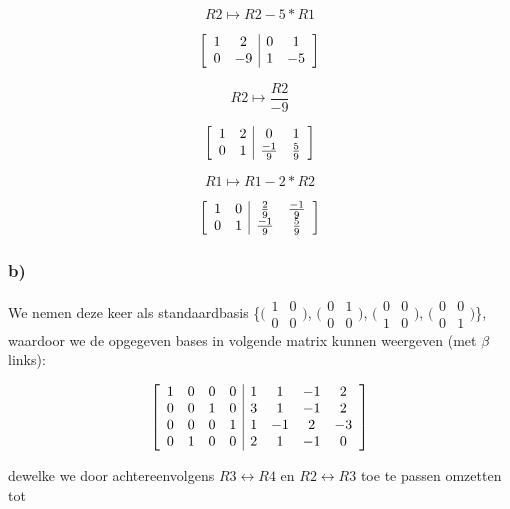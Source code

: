 \documentclass[lineaire_algebra_oplossingen.tex]{subfiles}
\begin{document}
\[R2 \mapsto R2 - 5*R1 \]

\[
\left[
\begin{array}{ c c | c c }
1 & 2 & 0 & 1\\
0 & -9 & 1 & -5
\end{array}
\right]
\]

\[R2 \mapsto \frac{R2}{-9} \]

\[
\left[
\begin{array}{ c c | c c }
1 & 2 & 0 & 1\\
0 & 1 & \frac{-1}{9} & \frac{5}{9}
\end{array}
\right]
\]

\[R1 \mapsto R1 - 2*R2 \]

\[
\left[
\begin{array}{ c c | c c }
1 & 0 & \frac{2}{9} & \frac{-1}{9}\\
0 & 1 & \frac{-1}{9} & \frac{5}{9}
\end{array}
\right]
\]

\subsubsection*{b)}

We nemen deze keer als standaardbasis \{$\bigl(
\begin{smallmatrix}
1&0\\ 0&0
\end{smallmatrix}
\bigr)$,
$\bigl(
\begin{smallmatrix}
0&1\\ 0&0
\end{smallmatrix}
\bigr)$,
$\bigl(
\begin{smallmatrix}
0&0\\ 1&0
\end{smallmatrix}
\bigr)$,
$\bigl(
\begin{smallmatrix}
0&0\\ 0&1
\end{smallmatrix}
\bigr)$\}, waardoor we de opgegeven bases in volgende matrix kunnen weergeven (met $\beta$ links):

\[
\left[
\begin{array}{ c c c c | c c c c }
1 & 0 & 0 & 0 & 1 & 1 & -1 & 2\\
0 & 0 & 1 & 0 & 3 & 1 & -1 & 2\\
0 & 0 & 0 & 1 & 1 & -1 & 2 & -3\\
0 & 1 & 0 & 0 & 2 & 1 & -1 & 0
\end{array}
\right]
\]

dewelke we door achtereenvolgens $R3 \leftrightarrow R4$ en $R2 \leftrightarrow R3$ toe te passen omzetten tot
\end{document}
